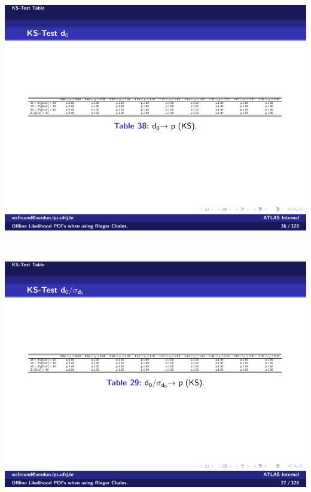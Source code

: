\begin{table}[p]
\begin{subtable}{\textwidth}
\includegraphics[width=\textwidth]{appendices/figures/gof/d0_ks_table.pdf}
\end{subtable} \\
\begin{subtable}{\textwidth}
\caption{\dOSignificance{}\label{tab:gof_ks_p_values_d0sig}}
\includegraphics[width=\textwidth]{appendices/figures/gof/d0sig_ks_table}
\end{subtable} \\
\end{table}
\FloatBarrier

